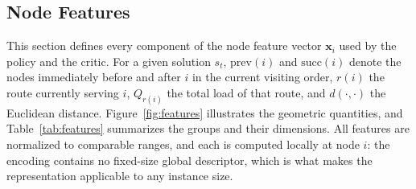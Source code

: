 \documentclass[letterpaper]{article} %
\begin{document}
\subsection{Node Features}
\label{app:features}

This section defines every component of the node feature vector $\mathbf{x}_i$ used by the policy and the critic. For a given solution $s_t$, $\mathrm{prev}(i)$ and $\mathrm{succ}(i)$ denote the nodes immediately before and after $i$ in the current visiting order, $r(i)$ the route currently serving $i$, $Q_{r(i)}$ the total load of that route, and $d(\cdot, \cdot)$ the Euclidean distance. Figure~\ref{fig:features} illustrates the geometric quantities, and Table~\ref{tab:features} summarizes the groups and their dimensions. All features are normalized to comparable ranges, and each is computed locally at node $i$: the encoding contains no fixed-size global descriptor, which is what makes the representation applicable to any instance size.
\end{document}
